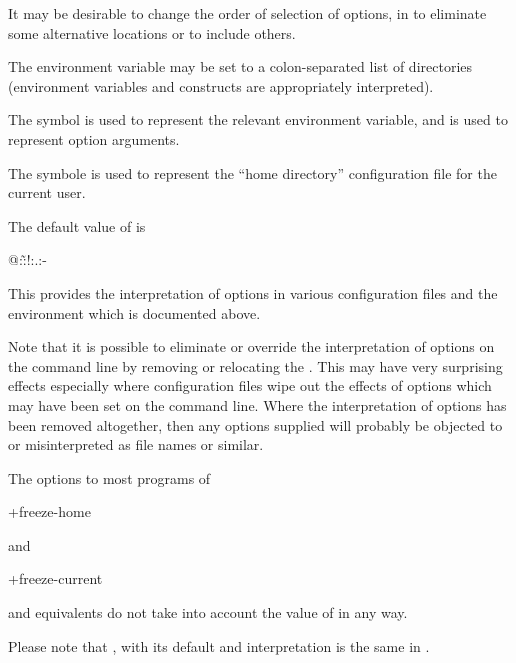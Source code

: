 It may be desirable to change the order of selection of options, in to eliminate some alternative locations or to include others.

The environment variable \configpathvar{} may be set to a colon-separated list of directories (environment variables and
 constructs are appropriately interpreted).

The symbol \exampletext{!} is used to represent the relevant environment variable, and \exampletext{{}-} is used to
represent option arguments.

The symbole  is used to represent the ``home directory'' configuration file \homeconfigpath{} for the current user.

The default value of \configpathvar{} is

\begin{expara}

@:\~:!:.:-

\end{expara}

This provides the interpretation of options in various configuration
files and the environment which is documented above.

Note that it is possible to eliminate or override the interpretation of options on the command line by removing or relocating the
\exampletext{{}-}. This may have very surprising effects especially where configuration files wipe out the effects of options
which may have been set on the command line. Where the interpretation of options has been removed altogether, then any options supplied will
probably be objected to or misinterpreted as file names or similar.

The options to most programs of

\begin{expara}

+freeze-home

\end{expara}

and

\begin{expara}

+freeze-current

\end{expara}

and equivalents do not take into account the value of \configpathvar{} in any way.

Please note that \configpathvar{}, with its default and interpretation is the same in 
\OtherProductName.

